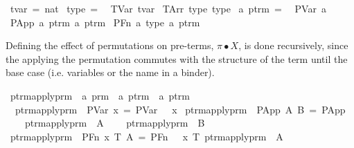\begin{implementation}
\isamarkupfalse%
\ tvar\ =\ nat\isanewline
\isanewline
{}\isamarkupfalse%
\ type\ =\isanewline
\ \ TVar\ tvar\isanewline
{\isacharbar}\ TArr\ type\ type\isanewline
\isanewline
{}\isamarkupfalse%
\ {\isacharprime}a\ ptrm\ =\isanewline
\ \ PVar\ {\isacharprime}a\isanewline
{\isacharbar}\ PApp\ {\isachardoublequoteopen}{\isacharprime}a\ ptrm{\isachardoublequoteclose}\ {\isachardoublequoteopen}{\isacharprime}a\ ptrm{\isachardoublequoteclose}\isanewline
{\isacharbar}\ PFn\ {\isacharprime}a\ type\ {\isachardoublequoteopen}{\isacharprime}a\ ptrm{\isachardoublequoteclose}\isanewline
\end{implementation}

Defining the effect of permutations on pre-terms, \(\pi \bullet X\), is done recursively, since the applying the permutation commutes with the structure of the term until the base case (i.e. variables or the name in a binder).

\begin{implementation}
\isamarkupfalse%
\ ptrm{\isacharunderscore}apply{\isacharunderscore}prm\ {\isacharcolon}{\isacharcolon}\ {\isachardoublequoteopen}{\isacharprime}a\ prm\ {\isasymRightarrow}\ {\isacharprime}a\ ptrm\ {\isasymRightarrow}\ {\isacharprime}a\ ptrm{\isachardoublequoteclose}\isanewline
\ \ {\isachardoublequoteopen}ptrm{\isacharunderscore}apply{\isacharunderscore}prm\ {\isasympi}\ {\isacharparenleft}PVar\ x{\isacharparenright}\ =\ PVar\ {\isacharparenleft}{\isasympi}\ {\isachardollar}\ x{\isacharparenright}{\isachardoublequoteclose}\isanewline
{\isacharbar}\ {\isachardoublequoteopen}ptrm{\isacharunderscore}apply{\isacharunderscore}prm\ {\isasympi}\ {\isacharparenleft}PApp\ A\ B{\isacharparenright}\ =\ PApp\isanewline
\ \ \ \ {\isacharparenleft}ptrm{\isacharunderscore}apply{\isacharunderscore}prm\ {\isasympi}\ A{\isacharparenright}\isanewline
\ \ \ \ {\isacharparenleft}ptrm{\isacharunderscore}apply{\isacharunderscore}prm\ {\isasympi}\ B{\isacharparenright}{\isachardoublequoteclose}\isanewline
{\isacharbar}\ {\isachardoublequoteopen}ptrm{\isacharunderscore}apply{\isacharunderscore}prm\ {\isasympi}\ {\isacharparenleft}PFn\ x\ T\ A{\isacharparenright}\ =\ PFn\ {\isacharparenleft}{\isasympi}\ {\isachardollar}\ x{\isacharparenright}\ T\ {\isacharparenleft}ptrm{\isacharunderscore}apply{\isacharunderscore}prm\ {\isasympi}\ A{\isacharparenright}{\isachardoublequoteclose}\isanewline
\end{implementation}

